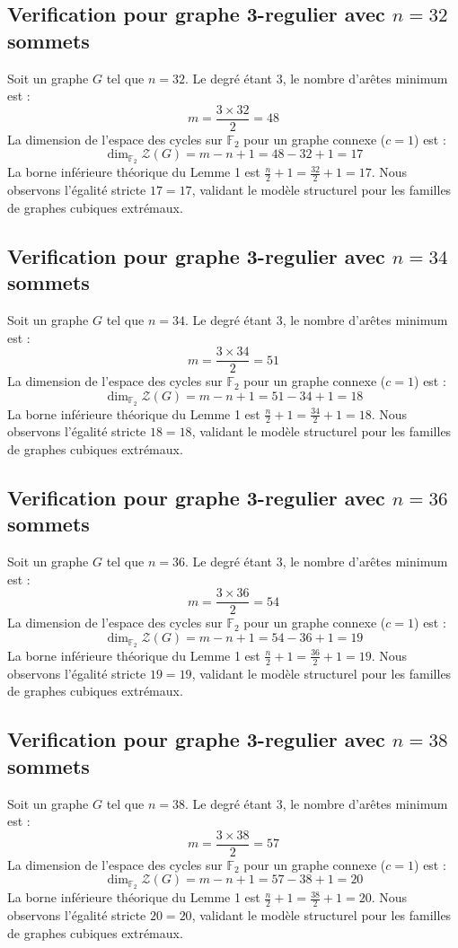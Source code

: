 \documentclass[11pt,a4paper]{article}
\begin{document}
\subsection{Verification pour graphe 3-regulier avec $n=32$ sommets}
Soit un graphe $G$ tel que $n = 32$. Le degré étant 3, le nombre d'arêtes minimum est :
$$ m = \frac{3 \times 32}{2} = 48 $$
La dimension de l'espace des cycles sur $\mathbb{F}_2$ pour un graphe connexe ($c=1$) est :
$$ \dim_{\mathbb{F}_2} \mathcal{Z}(G) = m - n + 1 = 48 - 32 + 1 = 17 $$
La borne inférieure théorique du Lemme 1 est $\frac{n}{2} + 1 = \frac{32}{2} + 1 = 17$.
Nous observons l'égalité stricte $17 = 17$, validant le modèle structurel pour les familles de graphes cubiques extrémaux.

\subsection{Verification pour graphe 3-regulier avec $n=34$ sommets}
Soit un graphe $G$ tel que $n = 34$. Le degré étant 3, le nombre d'arêtes minimum est :
$$ m = \frac{3 \times 34}{2} = 51 $$
La dimension de l'espace des cycles sur $\mathbb{F}_2$ pour un graphe connexe ($c=1$) est :
$$ \dim_{\mathbb{F}_2} \mathcal{Z}(G) = m - n + 1 = 51 - 34 + 1 = 18 $$
La borne inférieure théorique du Lemme 1 est $\frac{n}{2} + 1 = \frac{34}{2} + 1 = 18$.
Nous observons l'égalité stricte $18 = 18$, validant le modèle structurel pour les familles de graphes cubiques extrémaux.

\subsection{Verification pour graphe 3-regulier avec $n=36$ sommets}
Soit un graphe $G$ tel que $n = 36$. Le degré étant 3, le nombre d'arêtes minimum est :
$$ m = \frac{3 \times 36}{2} = 54 $$
La dimension de l'espace des cycles sur $\mathbb{F}_2$ pour un graphe connexe ($c=1$) est :
$$ \dim_{\mathbb{F}_2} \mathcal{Z}(G) = m - n + 1 = 54 - 36 + 1 = 19 $$
La borne inférieure théorique du Lemme 1 est $\frac{n}{2} + 1 = \frac{36}{2} + 1 = 19$.
Nous observons l'égalité stricte $19 = 19$, validant le modèle structurel pour les familles de graphes cubiques extrémaux.

\subsection{Verification pour graphe 3-regulier avec $n=38$ sommets}
Soit un graphe $G$ tel que $n = 38$. Le degré étant 3, le nombre d'arêtes minimum est :
$$ m = \frac{3 \times 38}{2} = 57 $$
La dimension de l'espace des cycles sur $\mathbb{F}_2$ pour un graphe connexe ($c=1$) est :
$$ \dim_{\mathbb{F}_2} \mathcal{Z}(G) = m - n + 1 = 57 - 38 + 1 = 20 $$
La borne inférieure théorique du Lemme 1 est $\frac{n}{2} + 1 = \frac{38}{2} + 1 = 20$.
Nous observons l'égalité stricte $20 = 20$, validant le modèle structurel pour les familles de graphes cubiques extrémaux.
\end{document}
